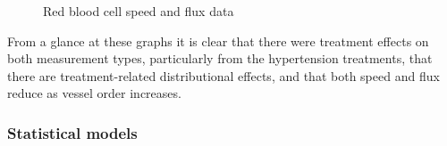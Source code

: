 \documentclass[
  letterpaper,
  DIV=11,
  numbers=noendperiod,
  oneside]{scrartcl}
\theoremstyle{plain}
\theoremstyle{remark}
\begin{document}
\begin{figure}


\caption{\label{fig-flow-data}Red blood cell speed and flux data}

\end{figure}%

From a glance at these graphs it is clear that there were treatment
effects on both measurement types, particularly from the hypertension
treatments, that there are treatment-related distributional effects, and
that both speed and flux reduce as vessel order increases.

\subsubsection{Statistical models}\label{statistical-models-2}
\end{document}
